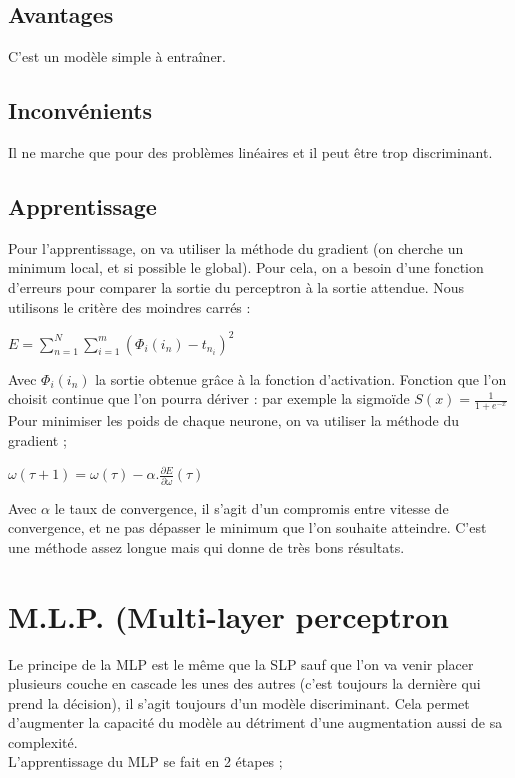 \documentclass[a4paper,12pt,oneside]{report}	%
\begin{document}
        \subsection*{Avantages}
            C'est un modèle simple à entraîner.
        \subsection*{Inconvénients}
            Il ne marche que pour des problèmes linéaires et il peut être trop discriminant.
        \subsection*{Apprentissage}
            Pour l'apprentissage, on va utiliser la méthode du gradient (on cherche un minimum local, et si possible le global). Pour cela, on a besoin d'une fonction d'erreurs pour comparer la sortie du perceptron à la sortie attendue. Nous utilisons le critère des moindres carrés :
            \begin{center}
                $E = \sum_{n=1}^N \sum_{i=1}^m (\Phi_i(i_n)-t_{n_i})^2$ 
            \end{center}
            Avec $\Phi_i(i_n)$ la sortie obtenue grâce à la fonction d'activation. Fonction que l'on choisit continue que l'on pourra dériver : par exemple la sigmoïde $S(x) = \frac{1}{1+e^{-x}}$\\
            Pour minimiser les poids de chaque neurone, on va utiliser la méthode du gradient ;
            \begin{center}
                $\omega(\tau+1)=\omega(\tau) - \alpha . \frac{\partial E}{\partial \omega}(\tau)$
            \end{center}
            Avec $\alpha$ le taux de convergence, il s'agit d'un compromis entre vitesse de convergence, et ne pas dépasser le minimum que l'on souhaite atteindre. C'est une méthode assez longue mais qui donne de très bons résultats. 
        
    \section{M.L.P. (Multi-layer perceptron}
        Le principe de la MLP est le même que la SLP sauf que l'on va venir placer plusieurs couche en cascade les unes des autres (c'est toujours la dernière qui prend la décision), il s'agit toujours d'un modèle discriminant. Cela permet d'augmenter la capacité du modèle au détriment d'une augmentation aussi de sa complexité.\\
        L'apprentissage du MLP se fait en 2 étapes ;
\end{document}
